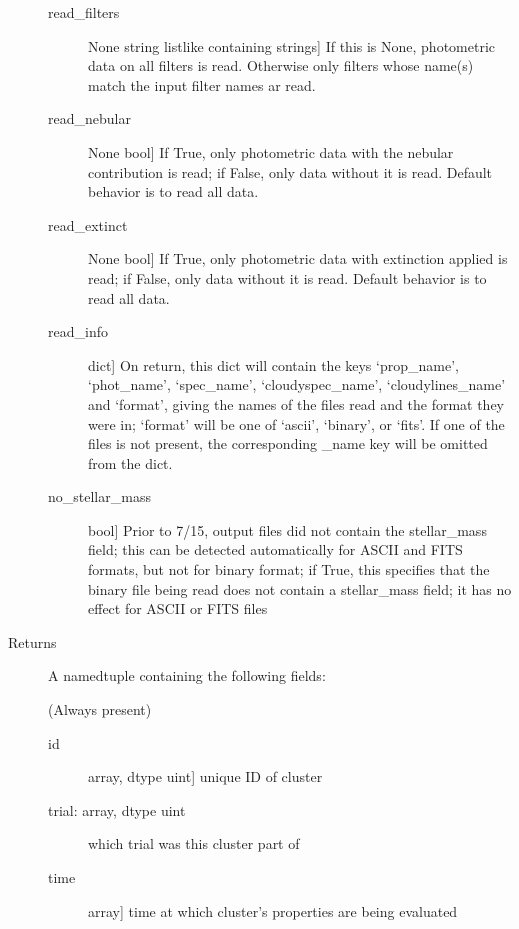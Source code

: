 \documentclass[letterpaper,10pt,english]{sphinxmanual}
\begin{document}
\begin{fulllineitems}
\begin{description}
\begin{description}
\item[{read\_filters}] \leavevmode{[}None \textbar{} string \textbar{} listlike containing strings{]}
If this is None, photometric data on all filters is
read. Otherwise only filters whose name(s) match the input
filter names ar read.

\item[{read\_nebular}] \leavevmode{[}None \textbar{} bool{]}
If True, only photometric data with the nebular contribution
is read; if False, only data without it is read. Default
behavior is to read all data.

\item[{read\_extinct}] \leavevmode{[}None \textbar{} bool{]}
If True, only photometric data with extinction applied is
read; if False, only data without it is read. Default
behavior is to read all data.

\item[{read\_info}] \leavevmode{[}dict{]}
On return, this dict will contain the keys `prop\_name',
`phot\_name', `spec\_name', `cloudyspec\_name', `cloudylines\_name'
and `format', giving the names of the files read and the format
they were in; `format' will be one of `ascii', `binary', or
`fits'. If one of the files is not present, the corresponding
\_name key will be omitted from the dict.

\item[{no\_stellar\_mass}] \leavevmode{[}bool{]}
Prior to 7/15, output files did not contain the stellar\_mass
field; this can be detected automatically for ASCII and FITS
formats, but not for binary format; if True, this specifies
that the binary file being read does not contain a
stellar\_mass field; it has no effect for ASCII or FITS files

\end{description}

\item[{Returns}] \leavevmode
A namedtuple containing the following fields:

(Always present)
\begin{description}
\item[{id}] \leavevmode{[}array, dtype uint{]}
unique ID of cluster

\item[{trial: array, dtype uint}] \leavevmode
which trial was this cluster part of

\item[{time}] \leavevmode{[}array{]}
time at which cluster's properties are being evaluated


\end{description}
\end{description}
\end{fulllineitems}
\end{document}
